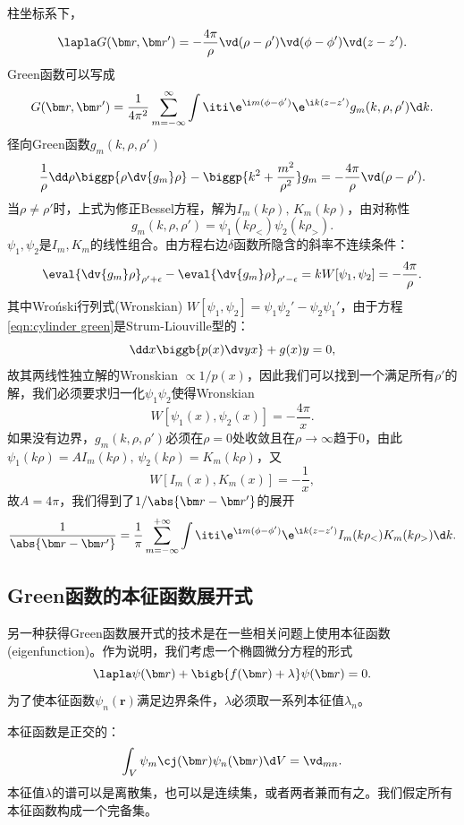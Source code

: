 柱坐标系下，
\[
    \lapla G(\bm r,\bm r')=-\frac{4\pi}\rho\vd(\rho-\rho')\vd(\phi-\phi')\vd(z-z').
\]
Green函数可以写成
\[
    G(\bm r,\bm r')=\frac1{4\pi^2}\sum_{m=-\infty}^\infty\int\iti\e^{\i m(\phi-\phi')}\e^{\i k(z-z')}g_m(k,\rho,\rho')\d k.
\]
径向Green函数$g_m(k,\rho,\rho')$
\begin{equation}
    \label{eqn:cylinder green}
    \frac1\rho\dd\rho\biggp{\rho\dv{g_m}\rho}-\biggp{k^2+\frac{m^2}{\rho^2}}g_m=-\frac{4\pi}\rho\vd(\rho-\rho').
\end{equation}
当$\rho\neq\rho'$时，上式为修正Bessel方程，解为$I_m(k\rho),\,K_m(k\rho)$，由对称性
\[
    g_m(k,\rho,\rho')=\psi_1(k\rho_<)\psi_2(k\rho_>).
\]
$\psi_1,\psi_2$是$I_m,K_m$的线性组合。由方程右边$\delta$函数所隐含的斜率不连续条件：
\[
    \eval{\dv{g_m}\rho}_{\rho'+\epsilon}-\eval{\dv{g_m}\rho}_{\rho'-\epsilon}=kW[\psi_1,\psi_2]=-\frac{4\pi}\rho.
\]
其中Wro\'nski行列式(Wronskian) $W[\psi_1,\psi_2]=\psi_1\psi_2'-\psi_2\psi_1'$，由于方程\eqref{eqn:cylinder green}是Strum-Liouville型的：
\[
    \dd x\biggb{p(x)\dv yx}+g(x)y=0,
\]
故其两线性独立解的Wronskian $\propto 1/p(x)$，因此我们可以找到一个满足所有$\rho'$的解，我们必须要求归一化$\psi_1\psi_2$使得Wronskian
\[
    W[\psi_1(x),\psi_2(x)]=-\frac{4\pi}x.
\]
如果没有边界，$g_m(k,\rho,\rho')$必须在$\rho=0$处收敛且在$\rho\to\infty$趋于0，由此$\psi_1(k\rho)=AI_m(k\rho),\,\psi_2(k\rho)=K_m(k\rho)$，又
\[
    W[I_m(x),K_m(x)]=-\frac1x,
\]
故$A=4\pi$，我们得到了$1/\abs{\bm r-\bm r'}$的展开 
\begin{equation}
    \frac1{\abs{\bm r-\bm r'}}=\frac1\pi\sum_{m=-\infty}^{+\infty}\int\iti\e^{\i m(\phi-\phi')}\e^{\i k(z-z')}I_m(k\rho_<)K_m(k\rho_>)\d k.
\end{equation}

\subsection{Green函数的本征函数展开式}
\label{ssec:eigenfunction expansions for Green functions}

另一种获得Green函数展开式的技术是在一些相关问题上使用本征函数(eigenfunction)。作为说明，我们考虑一个椭圆微分方程的形式
\begin{equation}
    \lapla\psi(\bm r)+\bigb{f(\bm r)+\lambda}\psi(\bm r)=0.
\end{equation}
为了使本征函数$\psi_n(\bm r)$满足边界条件，$\lambda$必须取一系列本征值$\lambda_n$。

本征函数是正交的：
\[
    \int_V\psi_m\cj(\bm r)\psi_n(\bm r)\d V=\vd_{mn}.
\]
本征值$\lambda$的谱可以是离散集，也可以是连续集，或者两者兼而有之。我们假定所有本征函数构成一个完备集。

